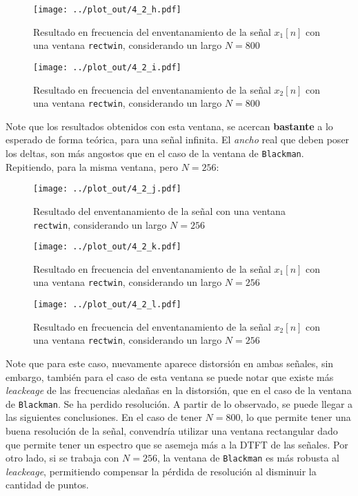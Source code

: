 	\begin{figure}[H]
			\center
			\texttt{[image: ../plot\_out/4\_2\_h.pdf]}
			\caption{Resultado en frecuencia del enventanamiento de la señal $x_{1}[n]$ con una ventana \texttt{rectwin}, considerando un largo $N = 800$}
			\label{fig:4_rectwin_800_1}
		\end{figure}	
			
	\begin{figure}[H]
			\center
			\texttt{[image: ../plot\_out/4\_2\_i.pdf]}
			\caption{Resultado en frecuencia del enventanamiento de la señal $x_{2}[n]$ con una ventana \texttt{rectwin}, considerando un largo $N = 800$}
			\label{fig:4_rectwin_800_2}
		\end{figure}	
			
			
			Note que los resultados obtenidos con esta ventana, se acercan \textbf{bastante} a lo esperado de forma teórica, para una señal infinita. El \textit{ancho} real que deben poser los deltas, son más angostos que en el caso de la ventana de \texttt{Blackman}. Repitiendo, para la misma ventana, pero $N = 256$:
	\begin{figure}[H]
			\center
			\texttt{[image: ../plot\_out/4\_2\_j.pdf]}
			\caption{Resultado del enventanamiento de la señal con una ventana \texttt{rectwin}, considerando un largo $N = 256$}
			\label{fig:4_sample_rectwin_256}
		\end{figure}	
	
	\begin{figure}[H]
			\center
			\texttt{[image: ../plot\_out/4\_2\_k.pdf]}
			\caption{Resultado en frecuencia del enventanamiento de la señal $x_{1}[n]$ con una ventana \texttt{rectwin}, considerando un largo $N = 256$}
			\label{fig:4_rectwin_256_1}
		\end{figure}	
			
	\begin{figure}[H]
			\center
			\texttt{[image: ../plot\_out/4\_2\_l.pdf]}
			\caption{Resultado en frecuencia del enventanamiento de la señal $x_{2}[n]$ con una ventana \texttt{rectwin}, considerando un largo $N = 256$}
			\label{fig:4_rectwin_256_2}
		\end{figure}	
		
		Note que para este caso, nuevamente aparece distorsión en ambas señales, sin embargo, también para el caso de esta ventana se puede notar que existe más \textit{leackeage} de las frecuencias aledañas en la distorsión, que en el caso de la ventana de \texttt{Blackman}. Se ha perdido resolución. A partir de lo observado, se puede llegar a las siguientes conclusiones. En el caso de tener $N=800$, lo que permite tener una buena resolución de la señal, convendría utilizar una ventana rectangular dado que permite tener un espectro que se asemeja más a la DTFT de las señales. Por otro lado, si se trabaja con $N=256$, la ventana de \texttt{Blackman} es más robusta al \textit{leackeage}, permitiendo compensar la pérdida de resolución al disminuir la cantidad de puntos.
			
